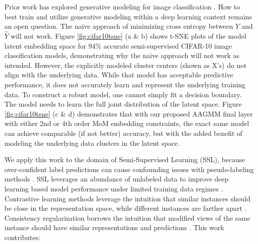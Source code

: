 \documentclass[10pt,twocolumn,letterpaper]{article}
\begin{document}
Prior work has explored generative modeling for image classification \cite{li2019disentangled,kingma2013auto,kingma2019introduction}.
How to best train and utilize generative modeling within a deep learning context remains an open question.
The naive approach of minimizing cross entropy between $Y$ and $\hat{Y}$ will not work.
Figure \ref{fig:cifar10tsne} (a \& b) shows t-SNE plots of the model latent embedding space for $94\%$ accurate semi-supervised CIFAR-10 \cite{cifar10} image classification models, demonstrating why the naive approach will not work as intended. 
However, the explicitly modeled cluster centers (shown as X's) do not align with the underlying data.
While that model has acceptable predictive performance, it does not accurately learn and represent the underlying training data.
To construct a robust model, one cannot simply fit a decision boundary.
The model needs to learn the full joint distribution of the latent space. 
Figure \ref{fig:cifar10tsne} (c \& d) demonstrates that with our proposed AAGMM final layer with either 2nd or 4th order MoM embedding constraints, the exact same model can achieve comparable (if not better) accuracy, but with the added benefit of modeling the underlying data clusters in the latent space.


We apply this work to the domain of Semi-Supervised Learning (SSL), because over-confident label predictions can cause confounding issues with pseudo-labeling methods \cite{arazo2020pseudo}.
SSL leverages an abundance of unlabeled data to improve deep learning based model performance under limited training data regimes \cite{zhu2022introduction,li2019safe,hady2013semi}.
Contrastive learning methods leverage the intuition that similar instances should be close in the representation space, while different instances are farther apart \cite{yang2022class,li2021comatch}.
Consistency regularization borrows the intuition that modified views of the same instance should have similar representations and predictions \cite{sohn2020fixmatch,lee2022contrastive,zhang2021flexmatch,kim2022conmatch}.
This work contributes:
\end{document}
